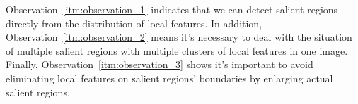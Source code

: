 Observation~\ref{itm:observation_1} indicates that we can detect salient regions directly from the distribution of local features. In addition, Observation~\ref{itm:observation_2} means it's necessary to deal with the situation of multiple salient regions with multiple clusters of local features in one image. Finally, Observation~\ref{itm:observation_3} shows it's important to avoid eliminating local features on salient regions' boundaries by enlarging actual salient regions.